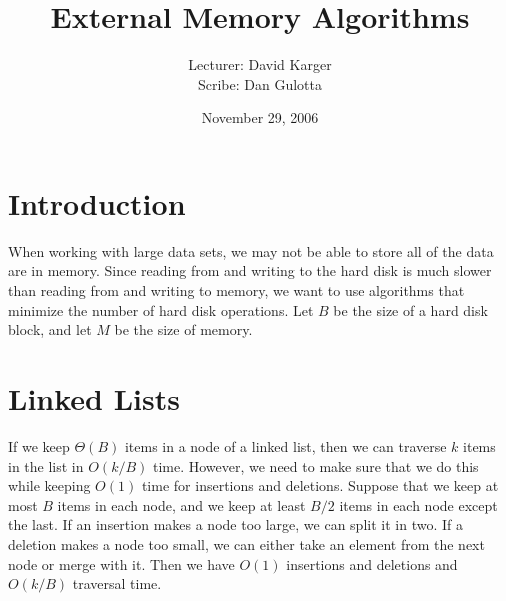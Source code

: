 \documentclass{article}
\title{External Memory Algorithms}
\date{November 29, 2006}
\author{Lecturer: David Karger\\ Scribe: Dan Gulotta}
\begin{document}
%
%
%
%

%



\section{Introduction}
When working with large data sets, we may not be
able to store all of the data are in memory.  Since
reading from and writing to the hard disk is much slower than
reading from and writing to memory, we want to
use algorithms that minimize the number of hard disk operations.  Let $B$ be the size of a hard disk block, and let $M$ be the size of memory.

\section{Linked Lists}
If we keep $\Theta(B)$ items in a node of a linked
list, then we can traverse $k$ items in the list in $O(k/B)$
time.  However, we need to make sure that we do this
while keeping $O(1)$ time for insertions and deletions.
Suppose that we keep at most $B$ items in each node, and we keep at least $B/2$ items in each node except the last.
If an insertion makes a node too large, we can split it in two.  If a deletion makes a node too small, we can either take an element from the next node or merge with it.
Then we have $O(1)$ insertions and deletions and $O(k/B)$
traversal time.
\end{document}
